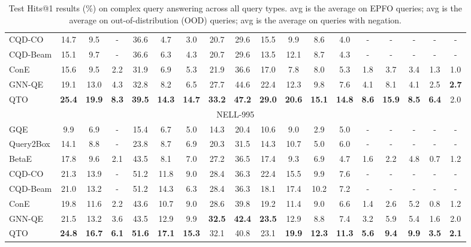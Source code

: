 \begin{table*}[!h]
\begin{adjustbox}{width=\textwidth}
\begin{tabular}{lccccccccccccccccc}
        CQD-CO & 14.7 & 9.5 & - & 36.6 & 4.7 & 3.0 & 20.7 & 29.6 & 15.5 & 9.9 & 8.6 & 4.0 & - & - & - & - & - \\
        CQD-Beam & 15.1 & 9.7 & - & 36.6 & 6.3 & 4.3 & 20.7 & 29.6 & 13.5 & 12.1 & 8.7 & 4.3 & - & - & - & - & - \\
        ConE & 15.6 & 9.5 & 2.2 & 31.9 & 6.9 & 5.3 & 21.9 & 36.6 & 17.0 & 7.8 & 8.0 & 5.3 & 1.8 & 3.7 & 3.4 & 1.3 & 1.0 \\
        GNN-QE & 19.1 & 13.0 & 4.3 & 32.8 & 8.2 & 6.5 & 27.7 & 44.6 & 22.4 & 12.3 & 9.8 & 7.6 & 4.1 & 8.1 & 4.1 & 2.5 & \bf{2.7} \\
        \midrule
        QTO & \bf{25.4} & \bf{19.9} & \bf{8.3} & \bf{39.5} & \bf{14.3} & \bf{14.7} & \bf{33.2} & \bf{47.2} & \bf{29.0} & \bf{20.6} & \bf{15.1} & \bf{14.8} & \bf{8.6} & \bf{15.9} & \bf{8.5} & \bf{6.4} & 2.0 \\
        \midrule[0.08em]
        \multicolumn{18}{c}{NELL-995} \\
        \midrule
        GQE & 9.9 & 6.9 & - & 15.4 & 6.7 & 5.0 & 14.3 & 20.4 & 10.6 & 9.0 & 2.9 & 5.0 & - & - & - & - & - \\
        Query2Box & 14.1 & 8.8 & - & 23.8 & 8.7 & 6.9 & 20.3 & 31.5 & 14.3 & 10.7 & 5.0 & 6.0 & - & - & - & - & - \\
        BetaE & 17.8 & 9.6 & 2.1 & 43.5 & 8.1 & 7.0 & 27.2 & 36.5 & 17.4 & 9.3 & 6.9 & 4.7 & 1.6 & 2.2 & 4.8 & 0.7 & 1.2 \\
        CQD-CO & 21.3 & 13.9 & - & 51.2 & 11.8 & 9.0 & 28.4 & 36.3 & 22.4 & 15.5 & 9.9 & 7.6 & - & - & - & - & - \\
        CQD-Beam & 21.0 & 13.2 & - & 51.2 & 14.3 & 6.3 & 28.4 & 36.3 & 18.1 & 17.4 & 10.2 & 7.2 & - & - & - & - & - \\
        ConE & 19.8 & 11.6 & 2.2 & 43.6 & 10.7 & 9.0 & 28.6 & 39.8 & 19.2 & 11.4 & 9.0 & 6.6 & 1.4 & 2.6 & 5.2 & 0.8 & 1.2 \\
        GNN-QE & 21.5 & 13.2 & 3.6 & 43.5 & 12.9 & 9.9 & \bf{32.5} & \bf{42.4} & \bf{23.5} & 12.9 & 8.8 & 7.4 & 3.2 & 5.9 & 5.4 & 1.6 & 2.0 \\
        \midrule
        QTO & \bf{24.8} & \bf{16.7} & \bf{6.1} & \bf{51.6} & \bf{17.1} & \bf{15.3} & 32.1 & 40.8 & 23.1 & \bf{19.9} & \bf{12.3} & \bf{11.3} & \bf{5.6} & \bf{9.4} & \bf{9.9} & \bf{3.5} & \bf{2.1} \\
        \bottomrule
    \end{tabular}
    \end{adjustbox}
    \caption{Test Hits@1 results (\%) on complex query answering across all query types. avg is the average on EPFO queries; avg is the average on out-of-distribution (OOD) queries; avg is the average on queries with negation.}
    \label{tb:h@1}
\end{table*}

